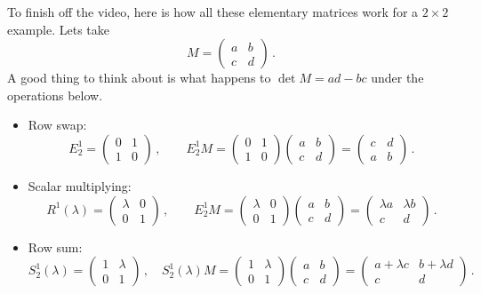 {To finish off the video, here is how all these elementary matrices work for a $2\times 2$ example. Lets take 
\[
M=\begin{pmatrix}a&b\\c&d\end{pmatrix}\, .
\]
A good thing to think about is what happens to $\det M = ad-bc$ under the operations below.
\begin{itemize}
\item Row swap:
\[
E^1_2=\begin{pmatrix}0&1\\1&0\end{pmatrix}\, ,\qquad
E^1_2 M = \begin{pmatrix}0&1\\1&0\end{pmatrix}\begin{pmatrix}a&b\\c&d\end{pmatrix}
=\begin{pmatrix}c&d\\a&b\end{pmatrix}\, .
\]
\item Scalar multiplying:
\[
R^1(\lambda)=\begin{pmatrix}\lambda&0\\0&1\end{pmatrix}\, ,\qquad
E^1_2 M = \begin{pmatrix}\lambda&0\\0&1\end{pmatrix}\begin{pmatrix}a&b\\c&d\end{pmatrix}
=\begin{pmatrix}\lambda a&\lambda b\\c&d\end{pmatrix}\, .
\]
\item Row sum:
\[
S^1_2(\lambda)=\begin{pmatrix}1&\lambda\\0&1\end{pmatrix}\, ,\quad
S^1_2(\lambda) M = \begin{pmatrix}1&\lambda\\0&1\end{pmatrix}\begin{pmatrix}a&b\\c&d\end{pmatrix}
=\begin{pmatrix}a+\lambda c&b+\lambda d\\c&d\end{pmatrix}\, .
\]
\end{itemize}


} %

